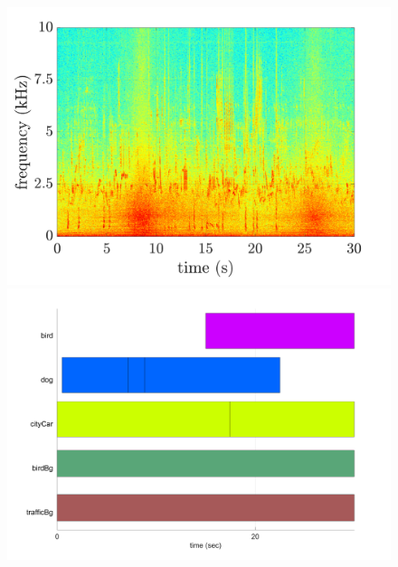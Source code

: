 \documentclass[twocolumn,a4paper,10pt]{article}
\begin{document}
\begin{figure}
\centering
   \begin{minipage}[c]{.32\linewidth}
      \includegraphics[width =\linewidth]{../image/spectrogramExample.pdf} 
   \end{minipage} 
   \begin{minipage}[c]{.32\linewidth}
      \includegraphics[width =\linewidth]{../image/animals_10-pianoRoll.png} 
   \end{minipage} 
   \begin{minipage}[c]{.32\linewidth}

\end{minipage}
\end{figure}
\end{document}
